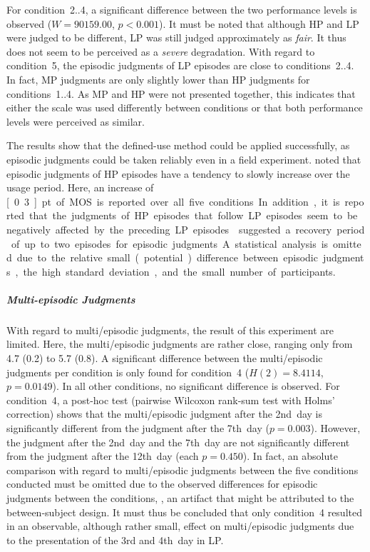 For condition~2..4, a significant difference between the two performance levels is observed ($W=90159.00$, $p<0.001$).
It must be noted that although \ac{HP} and \ac{LP} were judged to be different, \ac{LP} was still judged approximately as \emph{fair}.
It thus does not seem to be perceived as a \emph{severe} degradation.
With regard to condition~5, the episodic judgments of \ac{LP} episodes are close to conditions~2..4.
In fact, \ac{MP} judgments are only slightly lower than \ac{HP} judgments for conditions~1..4.
As \ac{MP} and \ac{HP} were not presented together, this indicates that either the scale was used differently between conditions or that both performance levels were perceived as similar.

The results show that the defined-use method could be applied successfully, as episodic judgments could be taken reliably even in a field experiment.
\citet{moller_single-call_2011} noted that episodic judgments of \ac{HP} episodes have a tendency to slowly increase over the usage period.
Here, an increase of \unit[0.3]{pt} of \ac{MOS} is reported over all five conditions.
In addition, it is reported that the judgments of \ac{HP} episodes that follow \ac{LP} episodes seem to be negatively affected by the preceding \ac{LP} episodes.
\citet{moller_single-call_2011} suggested a recovery period of up to two episodes for episodic judgments.
A statistical analysis is omitted due to the relative small (potential) difference between episodic judgments, the high standard deviation, and the small number of participants.

\subparagraph*{Multi-episodic Judgments}
With regard to multi\-/episodic judgments, the result of this experiment are limited.
Here, the multi\-/episodic judgments are rather close, ranging only from 4.7 (0.2) to 5.7 (0.8).
A significant difference between the multi\-/episodic judgments per condition is only found for condition~4 ($H(2)=8.4114$, $p=0.0149$).
In all other conditions, no significant difference is observed.
For condition~4, a post-hoc test (pairwise Wilcoxon rank-sum test with Holms' correction) shows that the multi\-/episodic judgment after the 2nd~day is significantly different from the judgment after the 7th~day ($p=0.003$).
However, the judgment after the 2nd~day and the 7th~day are not significantly different from the judgment after the 12th~day (each $p=0.450$).
In fact, an absolute comparison with regard to multi\-/episodic judgments between the five conditions conducted must be omitted due to the observed differences for episodic judgments between the conditions, \ie, an artifact that might be attributed to the between-subject design.
It must thus be concluded that only condition~4 resulted in an observable, although rather small, effect on multi\-/episodic judgments due to the presentation of the 3rd and 4th~day in \ac{LP}.

